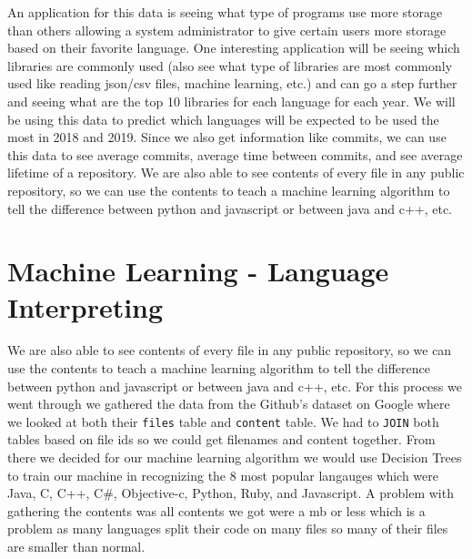 \documentclass[11pt]{article}
\begin{document}
An application for this data is seeing what type of programs use more
storage than others allowing a system administrator to give certain
users more storage based on their favorite language. One interesting
application will be seeing which libraries are commonly used (also see
what type of libraries are most commonly used like reading json/csv
files, machine learning, etc.) and can go a step further and seeing what
are the top 10 libraries for each language for each year. We will be
using this data to predict which languages will be expected to be used
the most in 2018 and 2019. Since we also get information like commits,
we can use this data to see average commits, average time between
commits, and see average lifetime of a repository. We are also able to
see contents of every file in any public repository, so we can use the
contents to teach a machine learning algorithm to tell the difference
between python and javascript or between java and c++, etc.

    \section{Machine Learning - Language
Interpreting}\label{machine-learning---language-interpreting}

    We are also able to see contents of every file in any public repository,
so we can use the contents to teach a machine learning algorithm to tell
the difference between python and javascript or between java and c++,
etc. For this process we went through we gathered the data from the
Github's dataset on Google where we looked at both their \texttt{files}
table and \texttt{content} table. We had to \texttt{JOIN} both tables
based on file ids so we could get filenames and content together. From
there we decided for our machine learning algorithm we would use
Decision Trees to train our machine in recognizing the 8 most popular
langauges which were Java, C, C++, C\#, Objective-c, Python, Ruby, and
Javascript. A problem with gathering the contents was all contents we
got were a mb or less which is a problem as many languages split their
code on many files so many of their files are smaller than normal.
\end{document}
